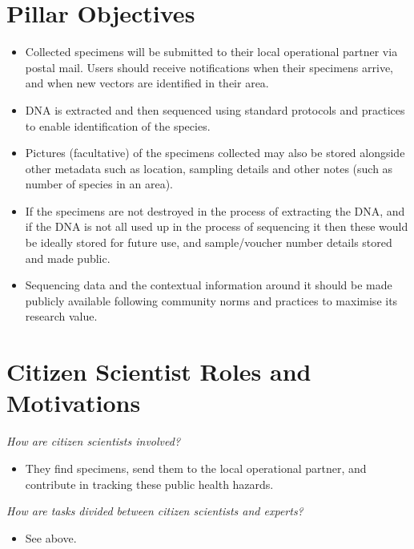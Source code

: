 \documentclass[]{article}
\providecommand{\tightlist}{%
  \setlength{\itemsep}{0pt}\setlength{\parskip}{0pt}}
\begin{document}
\hypertarget{objectives}{%
\section{Pillar Objectives}\label{objectives}}

\begin{itemize}
\item
  Collected specimens will be submitted to their local operational partner via postal mail. Users should receive notifications when their specimens arrive, and when new vectors are identified in their area.
\item
  DNA is extracted and then sequenced using standard protocols and practices to enable identification of the species.
\item
  Pictures (facultative) of the specimens collected may also be stored alongside other metadata such as location, sampling details and other notes (such as number of species in an area).
\item
  If the specimens are not destroyed in the process of extracting the DNA, and if the DNA is not all used up in the process of sequencing it then these would be ideally stored for future use, and sample/voucher number details stored and made public.
\item
  Sequencing data and the contextual information around it should be made publicly available following community norms and practices to maximise its research value.
\end{itemize}

\hypertarget{citizen-scientist-roles-and-motivations}{%
\section{Citizen Scientist Roles and Motivations}\label{citizen-scientist-roles-and-motivations}}

\emph{How are citizen scientists involved?}

\begin{itemize}
\tightlist
\item
  They find specimens, send them to the local operational partner, and contribute in tracking these public health hazards.
\end{itemize}

\emph{How are tasks divided between citizen scientists and experts?}

\begin{itemize}
\tightlist
\item
  See above.
\end{itemize}
\end{document}
